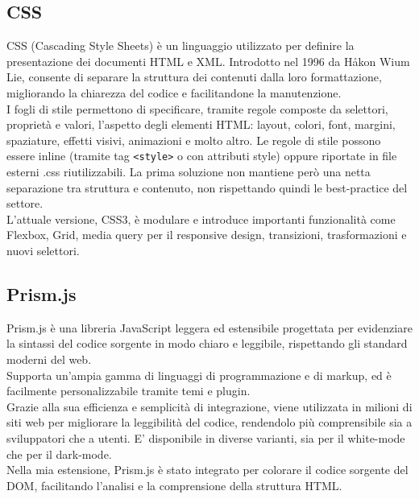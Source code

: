 \subsection{CSS}
\noindent CSS (Cascading Style Sheets) è un linguaggio utilizzato per definire la presentazione dei documenti HTML e XML. Introdotto nel 1996 da Håkon Wium Lie, consente di separare la struttura dei contenuti dalla loro formattazione, migliorando la chiarezza del codice e facilitandone la manutenzione.\\ 
I fogli di stile permettono di specificare, tramite regole composte da selettori, proprietà e valori, l’aspetto degli elementi HTML: layout, colori, font, margini, spaziature, effetti visivi, animazioni e molto altro. Le regole di stile possono essere inline (tramite tag \texttt{<style>} o con attributi style) oppure riportate in file esterni .css riutilizzabili. La prima soluzione non mantiene però una netta separazione tra struttura e contenuto, non rispettando quindi le best-practice del settore.\\ 
L'attuale versione, CSS3, è modulare e introduce importanti funzionalità come Flexbox, Grid, media query per il responsive design, transizioni, trasformazioni e nuovi selettori.

\subsection{Prism.js}
\noindent Prism.js è una libreria JavaScript leggera ed estensibile progettata per evidenziare la sintassi del codice sorgente in modo chiaro e leggibile, rispettando gli standard moderni del web. \\
Supporta un’ampia gamma di linguaggi di programmazione e di markup, ed è facilmente personalizzabile tramite temi e plugin. \\
Grazie alla sua efficienza e semplicità di integrazione, viene utilizzata in milioni di siti web per migliorare la leggibilità del codice, rendendolo più comprensibile sia a sviluppatori che a utenti. E’ disponibile in diverse varianti, sia per il white-mode che per il dark-mode.\\
Nella mia estensione, Prism.js è stato integrato per colorare il codice sorgente del DOM, facilitando l’analisi e la comprensione della struttura HTML.

